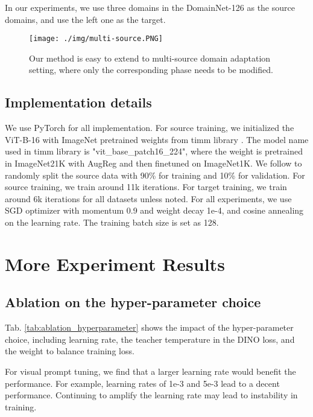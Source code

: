 \documentclass{article} \usepackage{iclr2023_conference,times}
\begin{document}
In our experiments, we use three domains in the DomainNet-126 as the source domains, and use the left one as the target.

\begin{figure}[h]
\begin{center}
\texttt{[image: ./img/multi-source.PNG]}
\end{center}
\caption{Our method is easy to extend to multi-source domain adaptation setting, where only the corresponding phase needs to be modified.  }
\label{fig:multi_source}
\end{figure}

\subsection{Implementation details} We use PyTorch for all implementation. For source training, we initialized the ViT-B-16 with ImageNet pretrained weights from timm library \citep{rw2019timm}. The model name used in timm library is "vit\_base\_patch16\_224", where the weight is pretrained in ImageNet21K with AugReg and then finetuned on ImageNet1K. We follow \citet{chen2022contrastive} to randomly split the source data with 90\% for training and 10\% for validation. For source training, we train around 11k iterations. For target training, we train around 6k iterations for all datasets unless noted. For all experiments, we use SGD optimizer with momentum 0.9 and weight decay 1e-4, and cosine annealing on the learning rate. The training batch size is set as 128.

\section{More Experiment Results}


\subsection{Ablation on the hyper-parameter choice}

Tab. \ref{tab:ablation_hyperparameter} shows the impact of the hyper-parameter choice, including learning rate, the teacher temperature in the DINO loss, and the weight to balance training loss. 

For visual prompt tuning, we find that a larger learning rate would benefit the performance. For example, learning rates of 1e-3 and 5e-3 lead to a decent performance. Continuing to amplify the learning rate may lead to instability in training.
\end{document}
